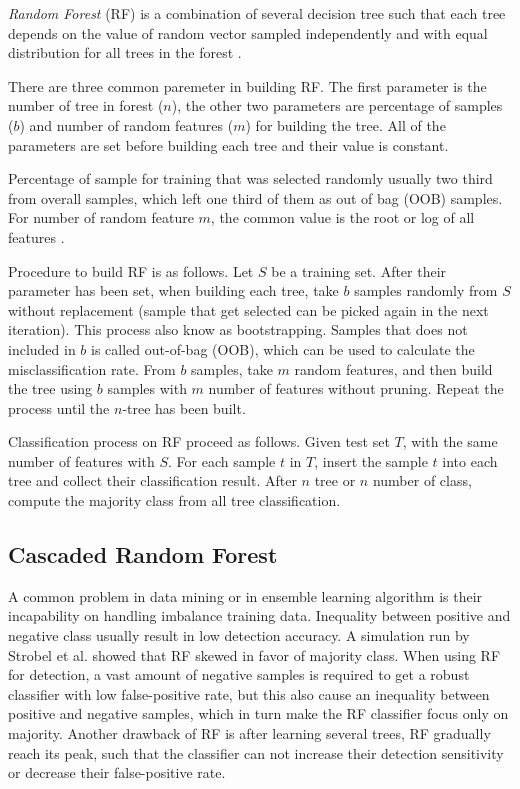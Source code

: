 \documentclass[conference,compsoc,a4paper,twocolumn,final]{IEEEtran}
\begin{document}
\textit{Random Forest} (RF)
is a combination of several decision tree such that each tree depends on the
value of random vector sampled independently and with equal distribution for
all trees in the forest
\cite{breiman2001random}.

There are three common paremeter in building RF.
The first parameter is the number of tree in forest ($n$),
the other two parameters are percentage of samples ($b$) and number of random
features ($m$) for building the tree.
All of the parameters are set before building each tree and their value is
constant.

Percentage of sample for training that was selected randomly usually two third
from overall samples, which left one third of them as out of bag (OOB) samples.
For number of random feature $m$, the common value is the root or log of all
features \cite{breiman2001random}.

Procedure to build RF is as follows.
Let $S$ be a training set.
After their parameter has been set, when building each tree, take $b$ samples
randomly from $S$ without replacement (sample that get selected can be picked
again in the next iteration).
This process also know as bootstrapping.
Samples that does not included in $b$ is called out-of-bag (OOB), which can be
used to calculate the misclassification rate.
From $b$ samples, take $m$ random features, and then build the tree using $b$
samples with $m$ number of features without pruning.
Repeat the process until the $n$-tree has been built.

Classification process on RF proceed as follows.
Given test set $T$, with the same number of features with $S$.
For each sample $t$ in $T$, insert the sample $t$ into each tree and collect
their classification result.
After $n$ tree or $n$ number of class, compute the majority class from all
tree classification.

\subsection{Cascaded Random Forest}
\label{subsection:crf}

A common problem in data mining or in ensemble learning algorithm is their
incapability on handling imbalance training data.
Inequality between positive and negative class usually result in low
detection accuracy.
A simulation run by Strobel et al. \cite{strobl2007bias} showed that RF skewed
in favor of majority class.
When using RF for detection, a vast amount of negative samples is required to
get a robust classifier with low false-positive rate, but this also cause an
inequality between positive and negative samples, which in turn make the RF
classifier focus only on majority.
Another drawback of RF is after learning several trees, RF gradually reach its
peak, such that the classifier can not increase their detection sensitivity or
decrease their false-positive rate.
\end{document}
